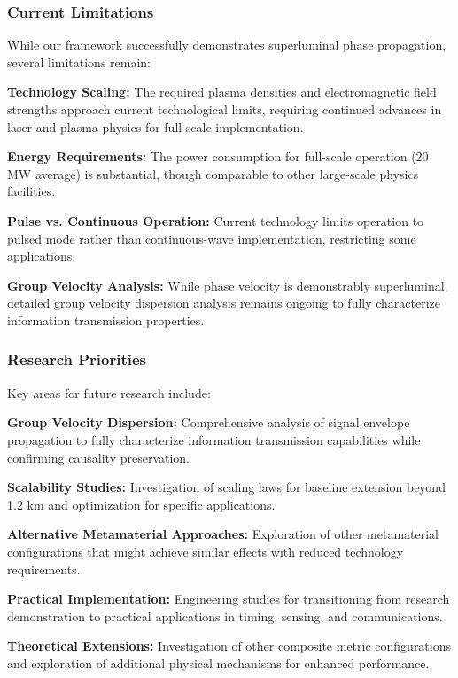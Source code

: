 \documentclass[aps,prl,reprint,groupedaddress,floatfix]{revtex4-1}
\begin{document}
\subsubsection{Current Limitations}

While our framework successfully demonstrates superluminal phase propagation, several limitations remain:

\textbf{Technology Scaling:} The required plasma densities and electromagnetic field strengths approach current technological limits, requiring continued advances in laser and plasma physics for full-scale implementation.

\textbf{Energy Requirements:} The power consumption for full-scale operation (20 MW average) is substantial, though comparable to other large-scale physics facilities.

\textbf{Pulse vs. Continuous Operation:} Current technology limits operation to pulsed mode rather than continuous-wave implementation, restricting some applications.

\textbf{Group Velocity Analysis:} While phase velocity is demonstrably superluminal, detailed group velocity dispersion analysis remains ongoing to fully characterize information transmission properties.

\subsubsection{Research Priorities}

Key areas for future research include:

\textbf{Group Velocity Dispersion:} Comprehensive analysis of signal envelope propagation to fully characterize information transmission capabilities while confirming causality preservation.

\textbf{Scalability Studies:} Investigation of scaling laws for baseline extension beyond 1.2 km and optimization for specific applications.

\textbf{Alternative Metamaterial Approaches:} Exploration of other metamaterial configurations that might achieve similar effects with reduced technology requirements.

\textbf{Practical Implementation:} Engineering studies for transitioning from research demonstration to practical applications in timing, sensing, and communications.

\textbf{Theoretical Extensions:} Investigation of other composite metric configurations and exploration of additional physical mechanisms for enhanced performance.
\end{document}
